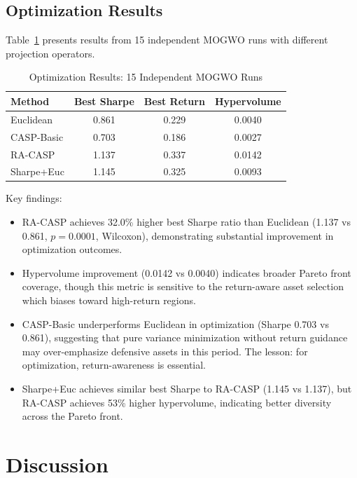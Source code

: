 \documentclass[10pt,twocolumn,a4paper]{article}
\begin{document}
\subsection{Optimization Results}

Table~\ref{tab:optimization} presents results from 15 independent MOGWO runs with different projection operators.

\begin{table}[H]
\centering
\caption{Optimization Results: 15 Independent MOGWO Runs}
\label{tab:optimization}
\small
\begin{tabular}{lccc}
\toprule
\textbf{Method} & \textbf{Best Sharpe} & \textbf{Best Return} & \textbf{Hypervolume} \\
\midrule
Euclidean & 0.861 & 0.229 & 0.0040 \\
CASP-Basic & 0.703 & 0.186 & 0.0027 \\
RA-CASP & 1.137 & 0.337 & 0.0142 \\
Sharpe+Euc & 1.145 & 0.325 & 0.0093 \\
\bottomrule
\end{tabular}
\end{table}

Key findings:
\begin{itemize}
    \item RA-CASP achieves 32.0\% higher best Sharpe ratio than Euclidean (1.137 vs 0.861, $p = 0.0001$, Wilcoxon), demonstrating substantial improvement in optimization outcomes.
    \item Hypervolume improvement (0.0142 vs 0.0040) indicates broader Pareto front coverage, though this metric is sensitive to the return-aware asset selection which biases toward high-return regions.
    \item CASP-Basic underperforms Euclidean in optimization (Sharpe 0.703 vs 0.861), suggesting that pure variance minimization without return guidance may over-emphasize defensive assets in this period. The lesson: for optimization, return-awareness is essential.
    \item Sharpe+Euc achieves similar best Sharpe to RA-CASP (1.145 vs 1.137), but RA-CASP achieves 53\% higher hypervolume, indicating better diversity across the Pareto front.
\end{itemize}

\section{Discussion}
\label{sec:discussion}
\end{document}
